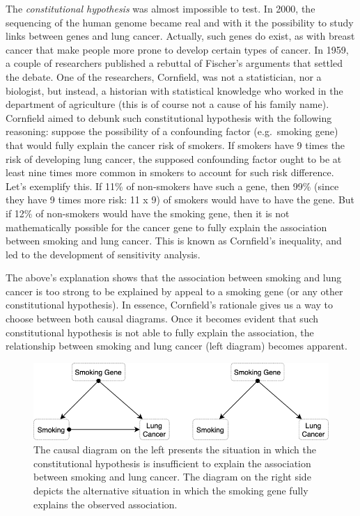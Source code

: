 \documentclass[
]{book}
\begin{document}
The \emph{constitutional hypothesis} was almost impossible to test. In 2000, the sequencing of the human genome became real and with it the possibility to study links between genes and lung cancer. Actually, such genes do exist, as with breast cancer that make people more prone to develop certain types of cancer. In 1959, a couple of researchers published a rebuttal of Fischer's arguments that settled the debate. One of the researchers, Cornfield, was not a statistician, nor a biologist, but instead, a historian with statistical knowledge who worked in the department of agriculture (this is of course not a cause of his family name). Cornfield aimed to debunk such constitutional hypothesis with the following reasoning: suppose the possibility of a confounding factor (e.g.~smoking gene) that would fully explain the cancer risk of smokers. If smokers have 9 times the risk of developing lung cancer, the supposed confounding factor ought to be at least nine times more common in smokers to account for such risk difference. Let's exemplify this. If 11\% of non-smokers have such a gene, then 99\% (since they have 9 times more risk: 11 x 9) of smokers would have to have the gene. But if 12\% of non-smokers would have the smoking gene, then it is not mathematically possible for the cancer gene to fully explain the association between smoking and lung cancer. This is known as Cornfield's inequality, and led to the development of sensitivity analysis.

The above's explanation shows that the association between smoking and lung cancer is too strong to be explained by appeal to a smoking gene (or any other constitutional hypothesis). In essence, Cornfield's rationale gives us a way to choose between both causal diagrams. Once it becomes evident that such constitutional hypothesis is not able to fully explain the association, the relationship between smoking and lung cancer (left diagram) becomes apparent.

\begin{figure}

{\centering \includegraphics[width=0.7\linewidth]{Figures/SmokeDebate_diagram} 

}

\caption{The causal diagram on the left presents the situation in which the constitutional hypothesis is insufficient to explain the association between smoking and lung cancer. The diagram on the right side depicts the alternative situation in which the smoking gene fully explains the observed association.}\label{fig:smoke-debate-dia}
\end{figure}
\end{document}
